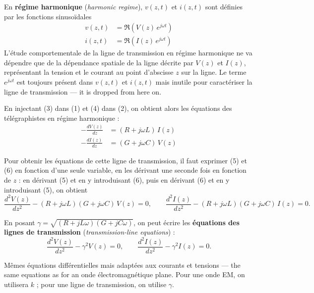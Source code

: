 En \textbf{régime harmonique} (\textit{harmonic regime}), $v(z,t)$ et $i(z,t)$
sont définies par les fonctions sinusoïdales
\begin{align}
  v(z,t) &= \Re\!\left(V(z)\,e^{j\omega t}\right) \tag{3}\\
  i(z,t) &= \Re\!\left(I(z)\,e^{j\omega t}\right) \tag{4}
\end{align}
L'étude comportementale de la ligne de transmission en régime harmonique ne va
dépendre que de la dépendance spatiale de la ligne décrite par $V(z)$ et
$I(z)$, représentant la tension et le courant au point d'abscisse $z$ sur la
ligne. Le terme $e^{j\omega t}$ est toujours présent dans $v(z,t)$ et $i(z,t)$
mais inutile pour caractériser la ligne de transmission --- it is dropped from
here on.

En injectant (3) dans (1) et (4) dans (2), on obtient alors les équations des
télégraphistes en régime harmonique :
\begin{align}
  -\frac{dV(z)}{dz} &= (R + j\omega L)\, I(z) \tag{5}\\
  -\frac{dI(z)}{dz} &= (G + j\omega C)\, V(z) \tag{6}
\end{align}

Pour obtenir les équations de cette ligne de transmission, il faut exprimer (5)
et (6) en fonction d'une seule variable, en les dérivant une seconde fois en
fonction de $z$ : en dérivant (5) et en y introduisant (6), puis en dérivant
(6) et en y introduisant (5), on obtient
\[
  \frac{d^2V(z)}{dz^2} - (R+j\omega L)(G+j\omega C)\,V(z) = 0,
  \qquad
  \frac{d^2I(z)}{dz^2} - (R+j\omega L)(G+j\omega C)\,I(z) = 0 .
\]

\begin{theorem}
  En posant $\gamma = \sqrt{(R+jL\omega)(G+jC\omega)}$, on peut écrire les
  \textbf{équations des lignes de transmission} (\textit{transmission-line
  equations}) :
  \[
    \boxed{\;\frac{d^2V(z)}{dz^2} - \gamma^2 V(z) = 0,
    \qquad
    \frac{d^2I(z)}{dz^2} - \gamma^2 I(z) = 0. \;}
  \]
\end{theorem}

\begin{remark}
  Mêmes équations différentielles mais adaptées aux courants et tensions ---
  the same equations as for an onde électromagnétique plane. Pour une onde EM,
  on utilisera $k$ ; pour une ligne de transmission, on utilise $\gamma$.
\end{remark}

